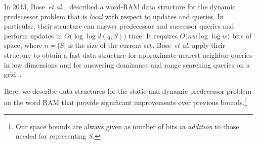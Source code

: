 \documentclass[a4paper,11pt]{article}
\newcommand{\etal}{\emph{et al.}\xspace}
\newcommand{\?}{\mskip1.5mu}
\begin{document}
In 2013, Bose~\etal~\cite{BoseDoDuHoMo13} described
a word-RAM data structure for the dynamic predecessor
problem that is \emph{local} with respect to updates
and queries.
In particular, their structure can answer predecessor 
and successor queries and perform updates 
in $O\big(\log\log d(q, S)\big)$ time.
It requires $O\big(n w \log\log w)$ bits 
of space, where $n = |S|$ is the size of the 
current set. Bose~\etal apply their structure 
to obtain a fast data structure for approximate nearest 
neighbor queries in low dimensions and for answering
dominance and range searching queries on a grid~\cite{BoseDoDuHoMo13}.

Here, we describe data structures for the
static and dynamic predecessor problem
on the word RAM that provide significant 
improvements over previous bounds.\footnote{Our 
space bounds are always given as
number of bits \emph{in addition} to those needed for 
representing $S$.} 
\end{document}
